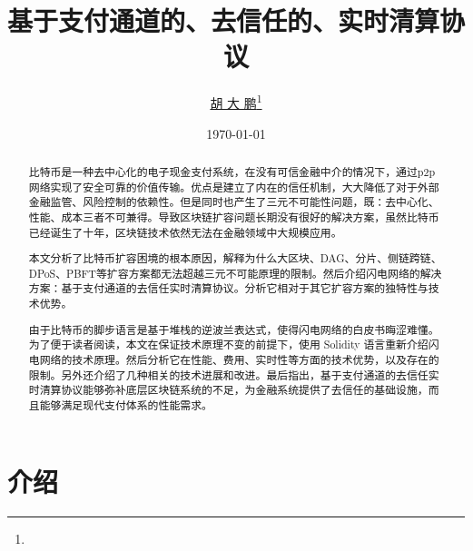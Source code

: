 \documentclass[lang=cn]{elegantpaper}
\title{基于支付通道的、去信任的、实时清算协议}
\author{\href{https://github.com/dapenghu}{胡 大 鹏}\thanks{}}
\institute{OK区块链工程院}
\date{\today}
\begin{document}
\maketitle
\begin{abstract}

比特币是一种去中心化的电子现金支付系统，在没有可信金融中介的情况下，通过p2p网络实现了安全可靠的价值传输。优点是建立了内在的信任机制，大大降低了对于外部金融监管、风险控制的依赖性。但是同时也产生了三元不可能性问题，既：去中心化、性能、成本三者不可兼得。导致区块链扩容问题长期没有很好的解决方案，虽然比特币已经诞生了十年，区块链技术依然无法在金融领域中大规模应用。

本文分析了比特币扩容困境的根本原因，解释为什么大区块、DAG、分片、侧链跨链、DPoS、PBFT等扩容方案都无法超越三元不可能原理的限制。然后介绍闪电网络的解决方案：基于支付通道的去信任实时清算协议。分析它相对于其它扩容方案的独特性与技术优势。

由于比特币的脚步语言是基于堆栈的逆波兰表达式，使得闪电网络的白皮书晦涩难懂。为了便于读者阅读，本文在保证技术原理不变的前提下，使用 Solidity 语言重新介绍闪电网络的技术原理。然后分析它在性能、费用、实时性等方面的技术优势，以及存在的限制。另外还介绍了几种相关的技术进展和改进。最后指出，基于支付通道的去信任实时清算协议能够弥补底层区块链系统的不足，为金融系统提供了去信任的基础设施，而且能够满足现代支付体系的性能需求。


\end{abstract}

\section{介绍}


\end{document}

